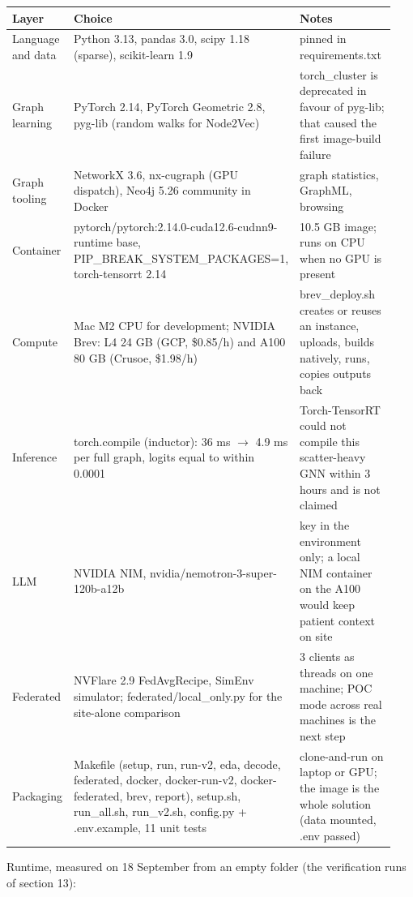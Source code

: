 \documentclass[11pt,a4paper]{article}
\begin{document}
\begin{longtable}{p{0.169\linewidth}p{0.442\linewidth}p{0.329\linewidth}}
\toprule
\textbf{Layer} & \textbf{Choice} & \textbf{Notes} \\
\midrule
\endhead
Language and data & Python 3.13, pandas 3.0, scipy 1.18 (sparse), scikit-learn 1.9 & pinned in requirements.txt \\
Graph learning & PyTorch 2.14, PyTorch Geometric 2.8, pyg-lib (random walks for Node2Vec) & torch\_cluster is deprecated in favour of pyg-lib; that caused the first image-build failure \\
Graph tooling & NetworkX 3.6, nx-cugraph (GPU dispatch), Neo4j 5.26 community in Docker & graph statistics, GraphML, browsing \\
Container & pytorch/pytorch:2.14.0-cuda12.6-cudnn9-runtime base, PIP\_BREAK\_SYSTEM\_PACKAGES=1, torch-tensorrt 2.14 & 10.5 GB image; runs on CPU when no GPU is present \\
Compute & Mac M2 CPU for development; NVIDIA Brev: L4 24 GB (GCP, \$0.85/h) and A100 80 GB (Crusoe, \$1.98/h) & brev\_deploy.sh creates or reuses an instance, uploads, builds natively, runs, copies outputs back \\
Inference & torch.compile (inductor): 36 ms $\rightarrow$ 4.9 ms per full graph, logits equal to within 0.0001 & Torch-TensorRT could not compile this scatter-heavy GNN within 3 hours and is not claimed \\
LLM & NVIDIA NIM, nvidia/nemotron-3-super-120b-a12b & key in the environment only; a local NIM container on the A100 would keep patient context on site \\
Federated & NVFlare 2.9 FedAvgRecipe, SimEnv simulator; federated/local\_only.py for the site-alone comparison & 3 clients as threads on one machine; POC mode across real machines is the next step \\
Packaging & Makefile (setup, run, run-v2, eda, decode, federated, docker, docker-run-v2, docker-federated, brev, report), setup.sh, run\_all.sh, run\_v2.sh, config.py + .env.example, 11 unit tests & clone-and-run on laptop or GPU; the image is the whole solution (data mounted, .env passed) \\
\bottomrule
\end{longtable}

Runtime, measured on 18 September from an empty folder (the verification runs of section 13):
\end{document}
